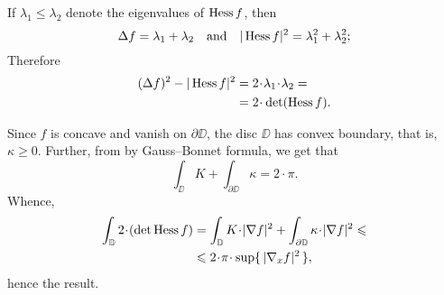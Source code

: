 If $\lambda_1\le \lambda_2$ denote the eigenvalues of $\operatorname{Hess} f$,
then 
\[\Delta f=\lambda_1+\lambda_2\quad\text{and}\quad |\operatorname{Hess} f|^2=\lambda_1^2+\lambda_2^2;\]
Therefore 
\begin{align*}
(\Delta f)^2-|\Hess f|^2&=2\cdot\lambda_1\cdot \lambda_2=
\\
&=2\cdot\det(\Hess f).
\end{align*}

Since $f$ is concave and vanish on $\partial\DD$, the disc $\DD$ has convex boundary, that is, $\kappa\ge 0$.
Further, from by Gauss--Bonnet formula, we get that
\[\int_\DD K+\int_{\partial\DD} \kappa =2\cdot \pi.\]
Whence, 
\begin{align*}
\int_\DD 2\cdot(\det\Hess f)
&=
\int_\DD K\cdot |\nabla f|^2
+
\int_{\partial\DD} \kappa\cdot |\nabla f|^2\le 
\\
&\le 2\cdot \pi \cdot \sup\{\,|\nabla_x f|^2\,\},
\end{align*}
hence the result. 
\qeds
